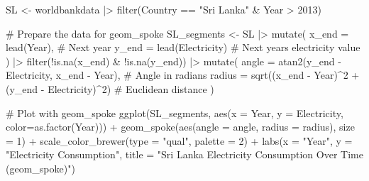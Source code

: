 \documentclass[
  letterpaper,
  DIV=11,
  numbers=noendperiod]{scrreprt}
\newenvironment{Shaded}{\begin{snugshade}}{\end{snugshade}}
\newcommand{\AttributeTok}[1]{\textcolor[rgb]{0.40,0.45,0.13}{#1}}
\newcommand{\CommentTok}[1]{\textcolor[rgb]{0.37,0.37,0.37}{#1}}
\newcommand{\DecValTok}[1]{\textcolor[rgb]{0.68,0.00,0.00}{#1}}
\newcommand{\FunctionTok}[1]{\textcolor[rgb]{0.28,0.35,0.67}{#1}}
\newcommand{\NormalTok}[1]{\textcolor[rgb]{0.00,0.23,0.31}{#1}}
\newcommand{\OtherTok}[1]{\textcolor[rgb]{0.00,0.23,0.31}{#1}}
\newcommand{\SpecialCharTok}[1]{\textcolor[rgb]{0.37,0.37,0.37}{#1}}
\newcommand{\StringTok}[1]{\textcolor[rgb]{0.13,0.47,0.30}{#1}}
\begin{document}
\begin{Shaded}
\begin{Highlighting}[]
\NormalTok{SL }\OtherTok{\textless{}{-}}\NormalTok{ worldbankdata }\SpecialCharTok{|\textgreater{}} 
  \FunctionTok{filter}\NormalTok{(Country }\SpecialCharTok{==} \StringTok{"Sri Lanka"} \SpecialCharTok{\&}\NormalTok{ Year }\SpecialCharTok{\textgreater{}} \DecValTok{2013}\NormalTok{)}

\CommentTok{\# Prepare the data for geom\_spoke}
\NormalTok{SL\_segments }\OtherTok{\textless{}{-}}\NormalTok{ SL }\SpecialCharTok{|\textgreater{}} 
  \FunctionTok{mutate}\NormalTok{(}
    \AttributeTok{x\_end =} \FunctionTok{lead}\NormalTok{(Year),  }\CommentTok{\# Next year}
    \AttributeTok{y\_end =} \FunctionTok{lead}\NormalTok{(Electricity)  }\CommentTok{\# Next year\textquotesingle{}s electricity value}
\NormalTok{  ) }\SpecialCharTok{|\textgreater{}} 
  \FunctionTok{filter}\NormalTok{(}\SpecialCharTok{!}\FunctionTok{is.na}\NormalTok{(x\_end) }\SpecialCharTok{\&} \SpecialCharTok{!}\FunctionTok{is.na}\NormalTok{(y\_end)) }\SpecialCharTok{|\textgreater{}} 
  \FunctionTok{mutate}\NormalTok{(}
    \AttributeTok{angle =} \FunctionTok{atan2}\NormalTok{(y\_end }\SpecialCharTok{{-}}\NormalTok{ Electricity, x\_end }\SpecialCharTok{{-}}\NormalTok{ Year),  }\CommentTok{\# Angle in radians}
    \AttributeTok{radius =} \FunctionTok{sqrt}\NormalTok{((x\_end }\SpecialCharTok{{-}}\NormalTok{ Year)}\SpecialCharTok{\^{}}\DecValTok{2} \SpecialCharTok{+}\NormalTok{ (y\_end }\SpecialCharTok{{-}}\NormalTok{ Electricity)}\SpecialCharTok{\^{}}\DecValTok{2}\NormalTok{)  }\CommentTok{\# Euclidean distance}
\NormalTok{  )}

\CommentTok{\# Plot with geom\_spoke}
\FunctionTok{ggplot}\NormalTok{(SL\_segments, }\FunctionTok{aes}\NormalTok{(}\AttributeTok{x =}\NormalTok{ Year, }\AttributeTok{y =}\NormalTok{ Electricity, }\AttributeTok{color=}\FunctionTok{as.factor}\NormalTok{(Year))) }\SpecialCharTok{+}
  \FunctionTok{geom\_spoke}\NormalTok{(}\FunctionTok{aes}\NormalTok{(}\AttributeTok{angle =}\NormalTok{ angle, }\AttributeTok{radius =}\NormalTok{ radius), }\AttributeTok{size =} \DecValTok{1}\NormalTok{) }\SpecialCharTok{+}
  \FunctionTok{scale\_color\_brewer}\NormalTok{(}\AttributeTok{type =} \StringTok{"qual"}\NormalTok{, }\AttributeTok{palette =} \DecValTok{2}\NormalTok{) }\SpecialCharTok{+}
  \FunctionTok{labs}\NormalTok{(}\AttributeTok{x =} \StringTok{"Year"}\NormalTok{,}
       \AttributeTok{y =} \StringTok{"Electricity Consumption"}\NormalTok{,}
       \AttributeTok{title =} \StringTok{"Sri Lanka Electricity Consumption Over Time (geom\_spoke)"}\NormalTok{)}
\end{Highlighting}
\end{Shaded}
\end{document}
